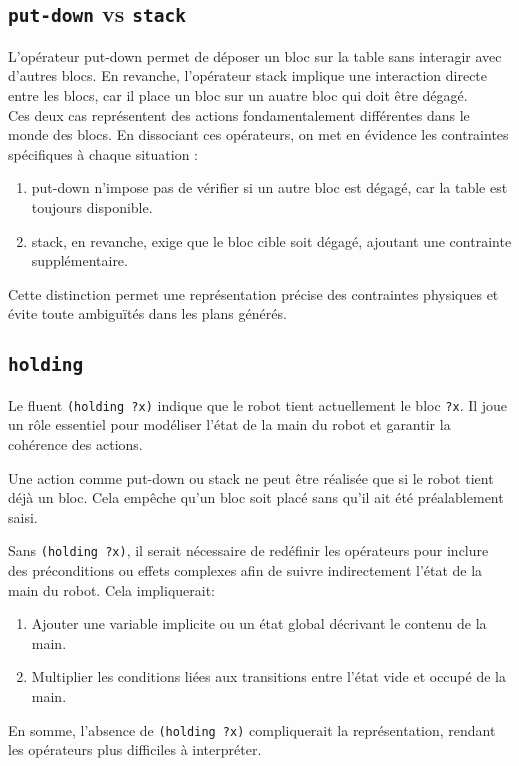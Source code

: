 \documentclass[../CSC_5RO16_TA_TP5.tex]{subfiles}
\begin{document}
\subsection{\texttt{put-down} vs \texttt{stack}}
\noindent L'opérateur put-down permet de déposer un bloc sur la table sans interagir avec d'autres blocs. En revanche, l'opérateur stack implique une interaction directe entre les blocs, car il place un bloc sur un auatre bloc qui doit être dégagé.\\

\noindent Ces deux cas représentent des actions fondamentalement différentes dans le monde des blocs. En dissociant ces opérateurs, on met en évidence les contraintes spécifiques à chaque situation :
\begin{enumerate}[noitemsep]
    \item put-down n'impose pas de vérifier si un autre bloc est dégagé, car la table est toujours disponible.
    \item stack, en revanche, exige que le bloc cible soit dégagé, ajoutant une contrainte supplémentaire.
\end{enumerate}
\noindent Cette distinction permet une représentation précise des contraintes physiques et évite toute ambiguïtés dans les plans générés.

\subsection{\texttt{holding}}
\noindent Le fluent \texttt{(holding ?x)} indique que le robot tient actuellement le bloc \texttt{?x}. Il joue un rôle essentiel pour modéliser l'état de la main du robot et garantir la cohérence des actions.
\begin{example}
    Une action comme put-down ou stack ne peut être réalisée que si le robot tient déjà un bloc. Cela empêche qu'un bloc soit placé sans qu'il ait été préalablement saisi.
\end{example}
\noindent Sans \texttt{(holding ?x)}, il serait nécessaire de redéfinir les opérateurs pour inclure des préconditions ou effets complexes afin de suivre indirectement l'état de la main du robot. Cela impliquerait:
\begin{enumerate}
    \item Ajouter une variable implicite ou un état global décrivant le contenu de la main.
    \item Multiplier les conditions liées aux transitions entre l'état vide et occupé de la main.
\end{enumerate}

\noindent En somme, l'absence de \texttt{(holding ?x)} compliquerait la représentation, rendant les opérateurs plus difficiles à interpréter.
\end{document}
